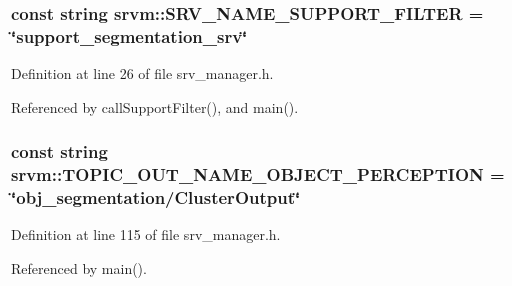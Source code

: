 \hypertarget{namespacesrvm_a326e9454009b64e7e5bac20f050ff129}{
\subsubsection[{S\-R\-V\-\_\-\-N\-A\-M\-E\-\_\-\-S\-U\-P\-P\-O\-R\-T\-\_\-\-F\-I\-L\-T\-E\-R}]{\setlength{\rightskip}{0pt plus 5cm}const string srvm\-::\-S\-R\-V\-\_\-\-N\-A\-M\-E\-\_\-\-S\-U\-P\-P\-O\-R\-T\-\_\-\-F\-I\-L\-T\-E\-R = \char`\"{}support\-\_\-segmentation\-\_\-srv\char`\"{}}}\label{namespacesrvm_a326e9454009b64e7e5bac20f050ff129}


Definition at line 26 of file srv\-\_\-manager.\-h.



Referenced by call\-Support\-Filter(), and main().

\hypertarget{namespacesrvm_a520b8813dc65ba764d59f05a0b316e5c}{
\subsubsection[{T\-O\-P\-I\-C\-\_\-\-O\-U\-T\-\_\-\-N\-A\-M\-E\-\_\-\-O\-B\-J\-E\-C\-T\-\_\-\-P\-E\-R\-C\-E\-P\-T\-I\-O\-N}]{\setlength{\rightskip}{0pt plus 5cm}const string srvm\-::\-T\-O\-P\-I\-C\-\_\-\-O\-U\-T\-\_\-\-N\-A\-M\-E\-\_\-\-O\-B\-J\-E\-C\-T\-\_\-\-P\-E\-R\-C\-E\-P\-T\-I\-O\-N = \char`\"{}obj\-\_\-segmentation/Cluster\-Output\char`\"{}}}\label{namespacesrvm_a520b8813dc65ba764d59f05a0b316e5c}


Definition at line 115 of file srv\-\_\-manager.\-h.



Referenced by main().

